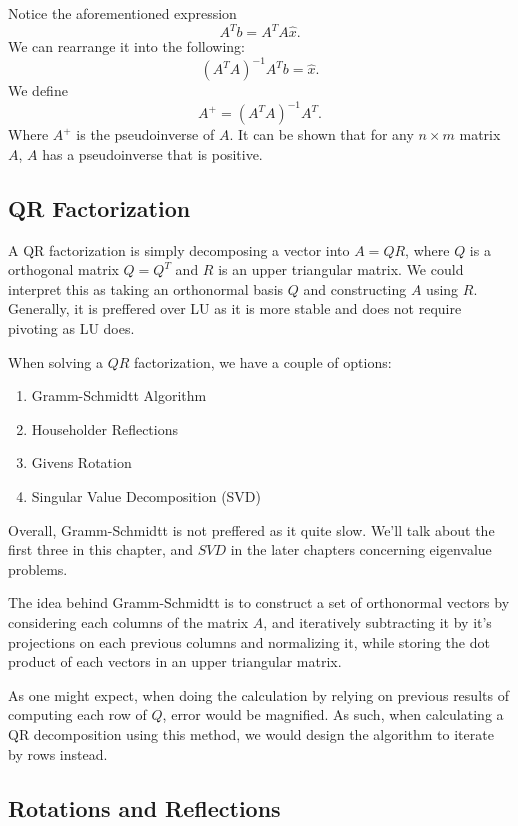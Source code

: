 \documentclass[5pt, a4paper]{article}
\begin{document}
     Notice the aforementioned expression \[
     A^{T}b = A^{T}A\hat{x}
     .\] 
     We can rearrange it into the following: \[
         (A^{T}A)^{-1}A^{T}b = \hat{x}
     .\] 
     We define \[
        A^{+} = (A^{T}A)^{-1}A^{T}
     .\] 
     Where $A^{+}$ is the pseudoinverse of $A$. It can be shown that for any
     $n\times m$ matrix $A$, $A$ has a pseudoinverse that is positive.

     \subsection*{QR Factorization}
     A QR factorization is simply decomposing a vector into $A = QR$, where $Q$ 
     is a orthogonal matrix $Q = Q^{T}$ and $R$ is an upper triangular matrix.
     We could interpret this as taking an orthonormal basis $Q$ and constructing
     $A$ using $R$. Generally, it is preffered over LU as it is more stable and
     does not require pivoting as LU does.

    When solving a $QR$ factorization, we have a couple of options: 
     \begin{enumerate}
        \item Gramm-Schmidtt Algorithm
        \item Householder Reflections 
        \item Givens Rotation
        \item Singular Value Decomposition (SVD)
    \end{enumerate}
    Overall, Gramm-Schmidtt is not preffered as it quite slow. We'll talk about
    the first three in this chapter, and $SVD$ in the later chapters concerning
    eigenvalue problems.

    \begin{tcolorbox}[title=Gramm-Schmidtt]
         The idea behind Gramm-Schmidtt is to construct a set of orthonormal
         vectors by considering each columns of the matrix $A$, and iteratively
         subtracting it by it's projections on each previous columns and
         normalizing it, while storing the dot product of each vectors in an
         upper triangular matrix.
    \end{tcolorbox}

    As one might expect, when doing the calculation by relying on previous
    results of computing each row of $Q$, error would be magnified. As such,
    when calculating a QR decomposition using this method, we would design the
    algorithm to iterate by rows instead.
    \subsection*{Rotations and Reflections}
\end{document}
